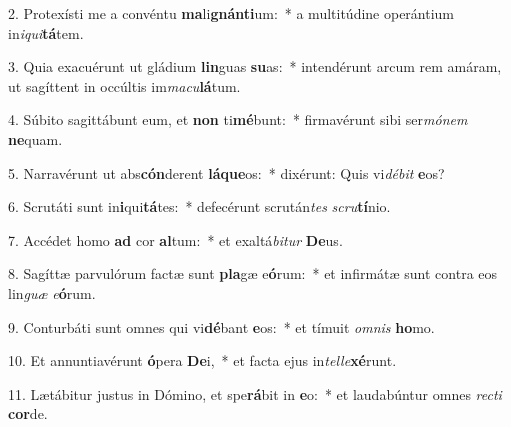 2. Protexísti me a convéntu \textbf{ma}li\textbf{gnán}\textbf{ti}um:~*  a multitúdine operántium in\textit{i}\textit{qui}\textbf{tá}tem.\

3. Quia exacuérunt ut gládium \textbf{lin}guas \textbf{su}as:~*  intendérunt arcum rem amáram, ut sagíttent in occúltis im\textit{ma}\textit{cu}\textbf{lá}tum.\

4. Súbito sagittábunt eum, et \textbf{non} ti\textbf{mé}bunt:~*  firmavérunt sibi ser\textit{mó}\textit{nem} \textbf{ne}quam.\

5. Narravérunt ut abs\textbf{cón}derent \textbf{lá}\textbf{que}os:~*  dixérunt: Quis vi\textit{dé}\textit{bit} \textbf{e}os?\

6. Scrutáti sunt in\textbf{i}qui\textbf{tá}tes:~*  defecérunt scrután\textit{tes} \textit{scru}\textbf{tí}nio.\

7. Accédet homo \textbf{ad} cor \textbf{al}tum:~*  et exaltá\textit{bi}\textit{tur} \textbf{De}us.\

8. Sagíttæ parvulórum factæ sunt \textbf{pla}gæ e\textbf{ó}rum:~*  et infirmátæ sunt contra eos lin\textit{guæ} \textit{e}\textbf{ó}rum.\

9. Conturbáti sunt omnes qui vi\textbf{dé}bant \textbf{e}os:~*  et tímuit \textit{om}\textit{nis} \textbf{ho}mo.\

10. Et annuntiavérunt \textbf{ó}pera \textbf{De}i,~*  et facta ejus in\textit{tel}\textit{le}\textbf{xé}runt.\

11. Lætábitur justus in Dómino, et spe\textbf{rá}bit in \textbf{e}o:~*  et laudabúntur omnes \textit{rec}\textit{ti} \textbf{cor}de.\


